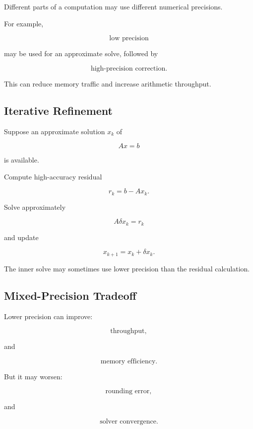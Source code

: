Different parts of a computation may use different numerical precisions.

For example,

\[
\boxed{
\text{low precision}
}
\]

may be used for an approximate solve, followed by

\[
\boxed{
\text{high-precision correction}.
}
\]

This can reduce memory traffic and increase arithmetic throughput.

\subsection{Iterative Refinement}
\label{subsec:hpmc-iterative-refinement}

Suppose an approximate solution \(x_k\) of

\[
Ax=b
\]

is available.

Compute high-accuracy residual

\[
\boxed{
r_k
=
b-Ax_k.
}
\]

Solve approximately

\[
\boxed{
A\delta x_k
=
r_k
}
\]

and update

\[
\boxed{
x_{k+1}
=
x_k+\delta x_k.
}
\]

The inner solve may sometimes use lower precision than the residual
calculation.

\subsection{Mixed-Precision Tradeoff}
\label{subsec:mixed-precision-tradeoff}

Lower precision can improve:

\[
\boxed{
\text{throughput},
}
\]

and

\[
\boxed{
\text{memory efficiency}.
}
\]

But it may worsen:

\[
\boxed{
\text{rounding error},
}
\]

and

\[
\boxed{
\text{solver convergence}.
}
\]

